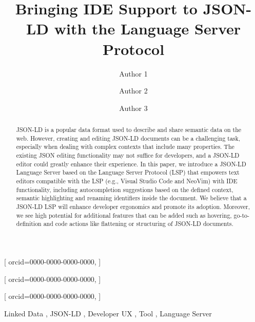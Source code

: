 \documentclass[
]{ceurart}
\begin{document}



\title{Bringing IDE Support to JSON-LD with the Language Server Protocol}


\author[1]{Author 1}[%
orcid=0000-0000-0000-0000,
]
\author[1]{Author 2}[%
orcid=0000-0000-0000-0000,
]
\author[1]{Author 3}[%
orcid=0000-0000-0000-0000,
]
\address[1]{Some place on the world}


\begin{abstract}
  JSON-LD is a popular data format used to describe and share semantic data on the web.
  However, creating and editing JSON-LD documents can be a challenging task, especially when dealing with complex contexts that include many properties.
  The existing JSON editing functionality may not suffice for developers, and a JSON-LD editor could greatly enhance their experience.
  In this paper, we introduce a JSON-LD Language Server based on the Language Server Protocol (LSP) that empowers text editors compatible with the LSP (e.g., Visual Studio Code and NeoVim) with IDE functionality, including autocompletion suggestions based on the defined context, semantic highlighting and renaming identifiers inside the document.
  We believe that a JSON-LD LSP will enhance developer ergonomics and promote its adoption.
  Moreover, we see high potential for additional features that can be added such as hovering, go-to-definition and code actions like flattening or structuring of JSON-LD documents.
\end{abstract}

\begin{keywords}
  Linked Data \sep 
  JSON-LD \sep
  Developer UX \sep
  Tool \sep
  Language Server
\end{keywords}
\end{document}
